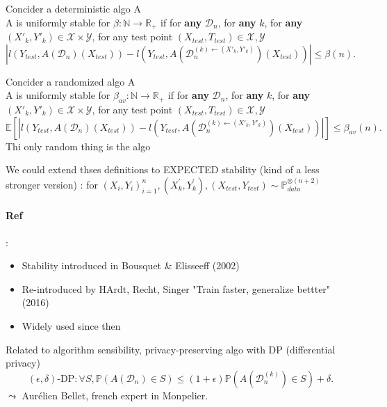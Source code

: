 \begin{defn}
    Concider a deterministic algo A \\
    A is uniformly stable for $ \beta : \mathbb{N} \to \mathbb{R}_+ $ if for \textbf{any} $\mathcal{D}_n$, for \textbf{any} $k$, for \textbf{any} $(X'_k, Y'_k) \in \mathcal{X} \times \mathcal{Y}$, for any test point $(X_{test}, T_{test}) \in \mathcal{X}, \mathcal{Y}$ 
    \[
        \left| l(Y_{test}, A(\mathcal{D}_n)(X_{test})) - l(Y_{test}, A(\mathcal{D}_n^{(k) \leftarrow (X'_{k}, Y'_{k} )})(X_{test})) \right| \leq \beta (n)
    .\]
    
\end{defn}

\begin{defn}
    Concider a randomized algo A \\
    A is uniformly stable for $ \beta_{av} : \mathbb{N} \to \mathbb{R}_+ $ if for \textbf{any} $\mathcal{D}_n$, for \textbf{any} $k$, for \textbf{any} $(X'_k, Y'_k) \in \mathcal{X} \times \mathcal{Y}$, for any test point $(X_{test}, T_{test}) \in \mathcal{X}, \mathcal{Y}$ 
    \[
        \mathbb{E}[\left| l(Y_{test}, A(\mathcal{D}_n)(X_{test})) - l(Y_{test}, A(\mathcal{D}_n^{(k) \leftarrow (X'_{k}, Y'_{k} )})(X_{test})) \right|] \leq \beta_{av} (n)
    .\]
    Thi only random thing is the algo
\end{defn}

\begin{note}[]
    We could extend thses definitions to EXPECTED stability (kind of a less stronger version) : for $ (X_i, Y_i)_{i=1} ^n, (X_k^\prime , Y_k^\prime ), (X_{test}, Y_{test}) \sim \mathbb{P}_{data}^{\otimes (n+2)} $ 
\end{note}

\paragraph*{Ref} : \begin{itemize}
    \item Stability introduced in Bousquet \& Elisseeff (2002)
    \item Re-introduced by HArdt, Recht, Singer "Train faster, generalize bettter" (2016)
    \item Widely used since then
\end{itemize}

\begin{note}[]
    Related to algorithm sensibility, privacy-preserving algo with DP (differential privacy) \\
    \[
        (\epsilon , \delta ) \text{-DP} : \forall S, \mathbb{P}(A(\mathcal{D}_n) \in S) \leq (1+\epsilon ) \mathbb{P}(A(\mathcal{D}_n^{(k)}) \in S) + \delta 
    .\]
    $\leadsto $ Aurélien Bellet, french expert in Monpelier.
\end{note}

